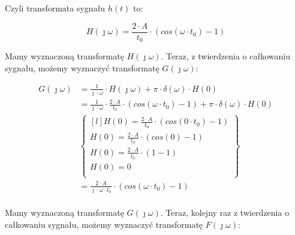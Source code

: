 \begin{task}
Czyli transformata sygnału $h(t)$ to:

\begin{equation}
H(\jmath \omega) = \frac{2 \cdot A}{t_{0}} \cdot \left(cos(\omega \cdot t_{0}) -1\right)
\end{equation}


Mamy wyznaczoną transformatę $H(\jmath \omega)$. Teraz, z twierdzenia o całkowaniu sygnału, możemy wyznaczyć transformatę $G(\jmath \omega)$:

\begin{align*}
G(\jmath \omega)&= \frac{1}{\jmath \cdot \omega} \cdot H(\jmath \omega) + \pi \cdot \delta(\omega) \cdot H(0)\\
&=\frac{1}{\jmath \cdot \omega} \cdot \frac{2 \cdot A}{t_{0}} \cdot \left(cos(\omega \cdot t_{0}) -1\right)+ \pi \cdot \delta(\omega) \cdot H(0)\\
&\begin{Bmatrix*}[l]
H(0)=\frac{2 \cdot A}{t_{0}} \cdot \left(cos(0 \cdot t_{0}) -1\right)\\
H(0)=\frac{2 \cdot A}{t_{0}} \cdot \left(cos(0) -1\right)\\
H(0)=\frac{2 \cdot A}{t_{0}} \cdot \left(1 -1\right)\\
H(0)=0\\
\end{Bmatrix*}\\
&=\frac{2 \cdot A}{\jmath \cdot \omega \cdot t_{0}} \cdot \left(cos(\omega \cdot t_{0}) -1\right)\\
\end{align*}




Mamy wyznaczoną transformatę $G(\jmath \omega)$. Teraz, kolejny raz z twierdzenia o całkowaniu sygnału, możemy wyznaczyć transformatę $F(\jmath \omega)$:


\end{task}
